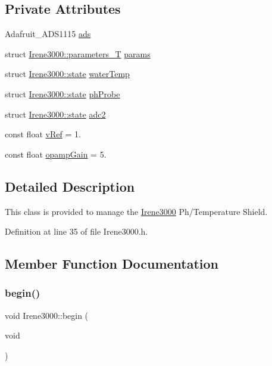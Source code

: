 \subsection*{Private Attributes}
\begin{DoxyCompactItemize}
\item 
Adafruit\+\_\+\+A\+D\+S1115 \hyperlink{classIrene3000_a1215e77ba761c9908d80d691f149e135}{ads}
\item 
struct \hyperlink{structIrene3000_1_1parameters__T}{Irene3000\+::parameters\+\_\+T} \hyperlink{classIrene3000_a136585a5ee7f9ac6ab52175fa153f8e3}{params}
\item 
struct \hyperlink{structIrene3000_1_1state}{Irene3000\+::state} \hyperlink{classIrene3000_af05612c78c758ce9db316c75ad937130}{water\+Temp}
\item 
struct \hyperlink{structIrene3000_1_1state}{Irene3000\+::state} \hyperlink{classIrene3000_a997a4ee466fa1d5416e07e444965dc9e}{ph\+Probe}
\item 
struct \hyperlink{structIrene3000_1_1state}{Irene3000\+::state} \hyperlink{classIrene3000_aae3a95a1c83c766cd2f299ce471c337e}{adc2}
\item 
const float \hyperlink{classIrene3000_a018e7ff9bee57e6d2b298667a668ba7e}{v\+Ref} = 1.
\item 
const float \hyperlink{classIrene3000_a4e588985ca74e5076029d5dee81034f2}{opamp\+Gain} = 5.
\end{DoxyCompactItemize}


\subsection{Detailed Description}
This class is provided to manage the \hyperlink{classIrene3000}{Irene3000} Ph/\+Temperature Shield. 

Definition at line 35 of file Irene3000.\+h.



\subsection{Member Function Documentation}
\mbox{\label{classIrene3000_ad5891806c500ae1007afe52b9e304c2b}} 
\subsubsection{\texorpdfstring{begin()}{begin()}}
{\footnotesize\ttfamily void Irene3000\+::begin (\begin{DoxyParamCaption}\item[{void}]{ }\end{DoxyParamCaption})}

